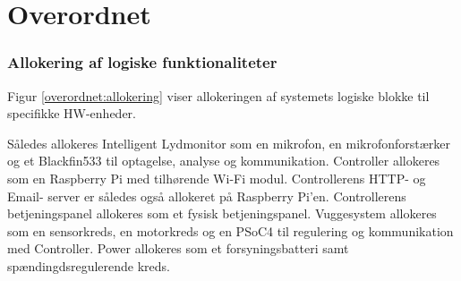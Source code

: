 \chapter{Overordnet}




%
%





\subsection{Allokering af logiske funktionaliteter}
Figur \ref{overordnet:allokering} viser allokeringen af systemets logiske blokke til specifikke HW-enheder.

Således allokeres Intelligent Lydmonitor som en mikrofon, en mikrofonforstærker og et Blackfin533 til optagelse, analyse og kommunikation.
Controller allokeres som en Raspberry Pi med tilhørende Wi-Fi modul. Controllerens HTTP- og Email- server er således også allokeret på Raspberry Pi'en. Controllerens betjeningspanel allokeres som et fysisk betjeningspanel.
Vuggesystem allokeres som en sensorkreds, en motorkreds og en PSoC4 til regulering og kommunikation med Controller.
Power allokeres som et forsyningsbatteri samt spændingdsregulerende kreds.


